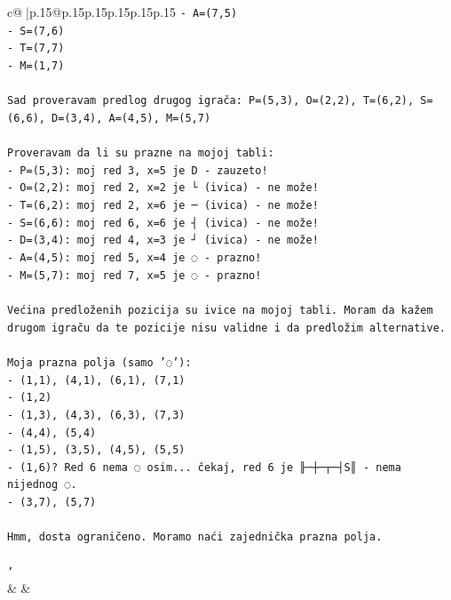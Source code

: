 \documentclass{article}
\begin{document}
{\begin{supertabular}{c@{$\;$}|p{.15\linewidth}@{}p{.15\linewidth}p{.15\linewidth}p{.15\linewidth}p{.15\linewidth}p{.15\linewidth}}
{{{\texttt{{-} A=(7,5)} \\
\texttt{{-} S=(7,6)} \\
\texttt{{-} T=(7,7)} \\
\texttt{{-} M=(1,7)} \\
\\ 
\texttt{Sad proveravam predlog drugog igrača: P=(5,3), O=(2,2), T=(6,2), S=(6,6), D=(3,4), A=(4,5), M=(5,7)} \\
\\ 
\texttt{Proveravam da li su prazne na mojoj tabli:} \\
\texttt{{-} P=(5,3): moj red 3, x=5 je D {-} zauzeto! } \\
\texttt{{-} O=(2,2): moj red 2, x=2 je └ (ivica) {-} ne može!} \\
\texttt{{-} T=(6,2): moj red 2, x=6 je ─ (ivica) {-} ne može!} \\
\texttt{{-} S=(6,6): moj red 6, x=6 je ┤ (ivica) {-} ne može!} \\
\texttt{{-} D=(3,4): moj red 4, x=3 je ┘ (ivica) {-} ne može!} \\
\texttt{{-} A=(4,5): moj red 5, x=4 je ◌ {-} prazno!} \\
\texttt{{-} M=(5,7): moj red 7, x=5 je ◌ {-} prazno!} \\
\\ 
\texttt{Većina predloženih pozicija su ivice na mojoj tabli. Moram da kažem drugom igraču da te pozicije nisu validne i da predložim alternative.} \\
\\ 
\texttt{Moja prazna polja (samo '◌'):} \\
\texttt{{-} (1,1), (4,1), (6,1), (7,1)} \\
\texttt{{-} (1,2)} \\
\texttt{{-} (1,3), (4,3), (6,3), (7,3)} \\
\texttt{{-} (4,4), (5,4)} \\
\texttt{{-} (1,5), (3,5), (4,5), (5,5)} \\
\texttt{{-} (1,6)? Red 6 nema ◌ osim... čekaj, red 6 je ╟─┼─┬─┤S║ {-} nema nijednog ◌.} \\
\texttt{{-} (3,7), (5,7)} \\
\\ 
\texttt{Hmm, dosta ograničeno. Moramo naći zajednička prazna polja.} \\
\\ 
\texttt{'} \\
            }
        }
    }
    & & \\ \\


\end{supertabular}}
\end{document}
